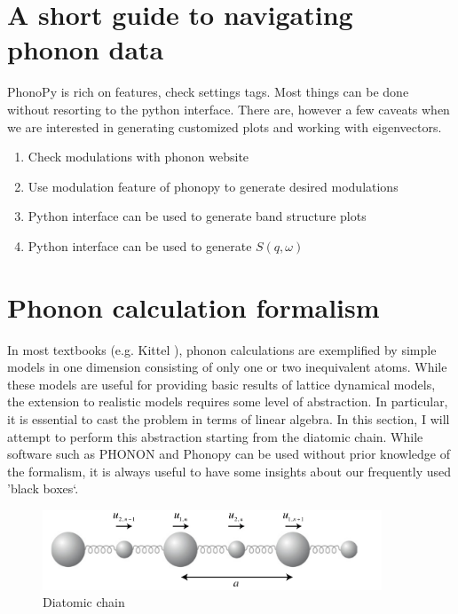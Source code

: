 \chapter{A short guide to navigating phonon data}

PhonoPy is rich on features, check settings tags. Most things can be done without resorting to the python interface. There are, however a few caveats when we are interested in generating customized plots and working with eigenvectors.

\begin{enumerate}
    \item Check modulations with phonon website
    \item Use modulation feature of phonopy to generate desired modulations
    \item Python interface can be used to generate band structure plots
    \item Python interface can be used to generate $S(q,\omega)$
\end{enumerate}

\chapter{Phonon calculation formalism}
In most textbooks (e.g. Kittel \cite{Kittel2005}), phonon calculations are exemplified by simple models in one dimension consisting of only one or two inequivalent atoms. While these models are useful for providing basic results of lattice dynamical models, the extension to realistic models requires some level of abstraction. In particular, it is essential to cast the problem in terms of linear algebra. In this section, I will attempt to perform this abstraction starting from the diatomic chain. While software such as PHONON \cite{Parlinski1997} and Phonopy \cite{Togo2015} can be used without prior knowledge of the formalism, it is always useful to have some insights about our frequently used 'black boxes`.

\begin{figure}
    \centering
    \includegraphics[width=0.9\textwidth]{fig/temp/diatomic.png}
    \caption{Diatomic chain}
    \label{fig:diatomic}
\end{figure}



